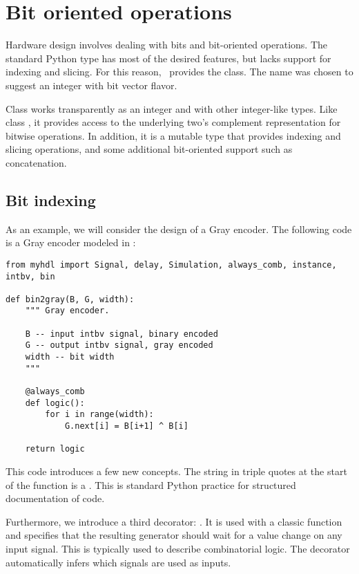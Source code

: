 \section{Bit oriented operations \label{intro-bit}}

Hardware design involves dealing with bits and bit-oriented
operations. The standard Python type  has most of the
desired features, but lacks support for indexing and slicing. For this
reason, \myhdl\ provides the  class. The name was chosen
to suggest an integer with bit vector flavor.

Class  works transparently as an integer and with other
integer-like types. Like class , it provides access to the
underlying two's complement representation for bitwise
operations. In addition, it is a mutable type that provides indexing
and slicing operations, and some additional bit-oriented support such
as concatenation.

\subsection{Bit indexing \label{intro-indexing}}

As an example, we will consider the design of a Gray encoder. The
following code is a Gray encoder modeled in \myhdl{}:

\begin{verbatim}
from myhdl import Signal, delay, Simulation, always_comb, instance, intbv, bin

def bin2gray(B, G, width):
    """ Gray encoder.

    B -- input intbv signal, binary encoded
    G -- output intbv signal, gray encoded
    width -- bit width
    """
    
    @always_comb
    def logic():
        for i in range(width):
            G.next[i] = B[i+1] ^ B[i]
            
    return logic
\end{verbatim}

This code introduces a few new concepts. The string in triple quotes
at the start of the function is a . This is standard
Python practice for structured documentation of code.

Furthermore, we introduce a third decorator: .
It is used with a classic function and specifies that the 
resulting generator should
wait for a value change on any input signal. This is typically used to
describe 
combinatorial logic. The  decorator
automatically infers which signals are used as inputs.

